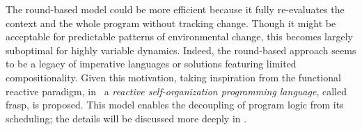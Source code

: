 The round-based model could be more efficient because it fully re-evaluates the context and the whole program without tracking change. Though it might be acceptable for predictable patterns of environmental change, this becomes largely suboptimal for highly variable dynamics. Indeed, the round-based approach seems to be a legacy of imperative languages or solutions featuring limited compositionality. Given this motivation, taking inspiration from the functional reactive paradigm, in~\cite{Casadei2023} a \textit{reactive self-organization programming language}, called \ac{frasp}, is proposed. This model enables the decoupling of program logic from its scheduling; the details will be discussed more deeply in .